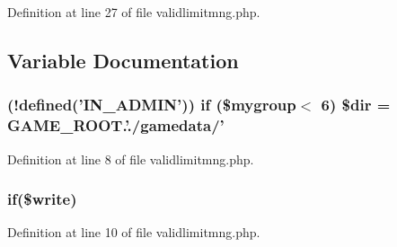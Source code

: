 Definition at line 27 of file validlimitmng.\+php.



\subsection{Variable Documentation}
\hypertarget{validlimitmng_8php_a52f755b4129debc2fb881cc83d9ed6b7}{
\subsubsection[{\$dir}]{ (!defined('{\bf I\+N\+\_\+\+A\+D\+M\+I\+N}')) {\bf if} (\$mygroup$<$ 6) \$dir = G\+A\+M\+E\+\_\+\+R\+O\+O\+T.'./gamedata/'}}\label{validlimitmng_8php_a52f755b4129debc2fb881cc83d9ed6b7}


Definition at line 8 of file validlimitmng.\+php.

\hypertarget{validlimitmng_8php_abf4a313c4e0149e01b356baa1136514f}{
\subsubsection[{if}]{\setlength{\rightskip}{0pt plus 5cm}if(\$write)}}\label{validlimitmng_8php_abf4a313c4e0149e01b356baa1136514f}


Definition at line 10 of file validlimitmng.\+php.

